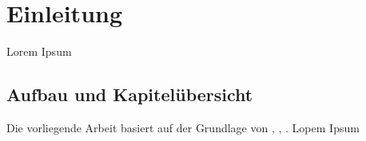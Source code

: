 \chapter{Einleitung}
\label{chapter_einleitung}


 Lorem Ipsum
 
 

\newpage

\section{Aufbau und Kapitelübersicht}
\label{section_aufbau}

Die vorliegende Arbeit basiert auf der Grundlage von
\cite{boettcher2012:service}, \cite{bucksteeg2012:itil},
\cite{bucksteeg2012:itil}. Lopem Ipsum


%